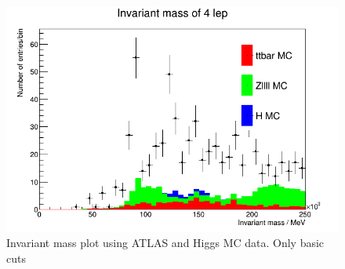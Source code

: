 \begin{figure}[h!]
    \centering
	\includegraphics[width=0.85\linewidth]{plots/02-03-2021/15-20.png}
    \caption{Invariant mass plot using ATLAS and Higgs MC data.  Only basic cuts }
    \label{fig:15:20_02-03-21}
\end{figure}
    
